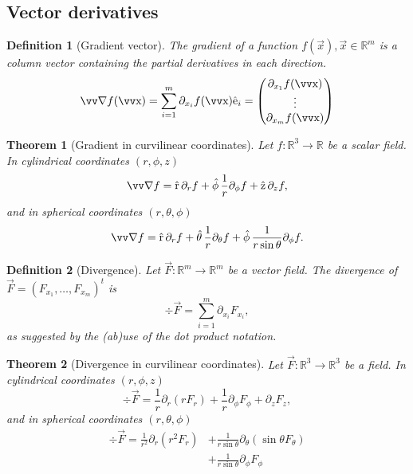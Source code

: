 \documentclass[margin=small]{tex/hsrzf}
\theoremstyle{elmagzf}
\newtheorem{theorem}{Theorem}
\newtheorem{definition}{Definition}
\begin{document}
\subsection{Vector derivatives}

\begin{definition}[Gradient vector]
  The \emph{gradient} of a function \(f(\vec{x}), \vec{x}\in\mathbb{R}^m\) is a
  column vector containing the partial derivatives
  in each direction.
  \[
    \grad f (\vec{x}) = \sum_{i=1}^m \partial_{x_i} f(\vec{x}) \uvec{e}_i
      = \begin{pmatrix}
        \partial_{x_1} f(\vec{x}) \\
        \vdots \\
        \partial_{x_m} f(\vec{x}) \\
      \end{pmatrix}
  \]
\end{definition}

\begin{theorem}[Gradient in curvilinear coordinates]
  Let \(f: \mathbb{R}^3 \to \mathbb{R}\) be a scalar field. In cylindrical
  coordinates \((r,\phi,z)\)
  \[
    \grad f = \uvec{r}\,\partial_r f 
      + \uvec{\phi}\,\frac{1}{r}\partial_\phi f
      + \uvec{z}\,\partial_z f,
  \]
  and in spherical coordinates \((r,\theta,\phi)\)
  \[
    \grad f = \uvec{r}\,\partial_r f
      + \uvec{\theta}\,\frac{1}{r} \partial_\theta f
      + \uvec{\phi}\,\frac{1}{r \sin\theta} \partial_\phi f.
  \]
\end{theorem}

\begin{definition}[Divergence]
  Let \(\vec{F}: \mathbb{R}^m \to \mathbb{R}^m\) be a vector field.
  The divergence of \(\vec{F} = (F_{x_1},\ldots, F_{x_m})^t\) is
  \[
    \div\vec{F} = \sum_{i = 1}^m \partial_{x_i} F_{x_i} ,
  \]
  as suggested by the (ab)use of the dot product notation.
\end{definition}

\begin{theorem}[Divergence in curvilinear coordinates]
  Let \(\vec{F}: \mathbb{R}^3 \to \mathbb{R}^3\) be a field. In cylindrical
  coordinates \((r,\phi,z)\)
  \[
    \div \vec{F} = \frac{1}{r} \partial_r (r F_r)
      + \frac{1}{r}\partial_\phi F_\phi
      + \partial_z F_z,
  \]
  and in spherical coordinates \((r,\theta,\phi)\)
  \begin{align*}
    \div \vec{F} = \frac{1}{r^2} \partial_r (r^2 F_r)
      & + \frac{1}{r \sin\theta} \partial_\theta (\sin\theta F_\theta) \\
      & + \frac{1}{r \sin\theta} \partial_\phi F_\phi
  \end{align*}
\end{theorem}
\end{document}
